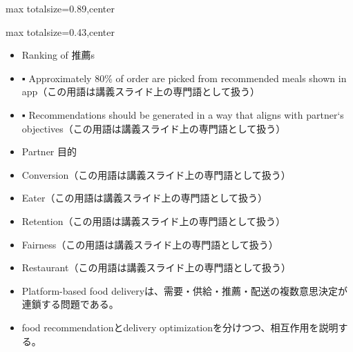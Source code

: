 \begin{minipage}[t]{0.58\textwidth}
\begin{adjustbox}{max totalsize={\textwidth}{0.89\textheight},center}
\begin{minipage}{\textwidth}
\end{minipage}
\end{adjustbox}
\end{minipage}


\clearpage
{}
\begin{minipage}[t]{0.405\textwidth}
\begin{adjustbox}{max totalsize={\textwidth}{0.43\textheight},center}
\begin{minipage}{\textwidth}\scriptsize
{}\begin{itemize}
\item Ranking of 推薦s
\item ▪ Approximately 80\% of order are picked from recommended meals shown in app（この用語は講義スライド上の専門語として扱う）
\item ▪ Recommendations should be generated in a way that aligns with partner‘s objectives（この用語は講義スライド上の専門語として扱う）
\item Partner 目的
\item Conversion（この用語は講義スライド上の専門語として扱う）
\item Eater（この用語は講義スライド上の専門語として扱う）
\item Retention（この用語は講義スライド上の専門語として扱う）
\item Fairness（この用語は講義スライド上の専門語として扱う）
\item Restaurant（この用語は講義スライド上の専門語として扱う）
\end{itemize}\begin{itemize}
\item Platform-based food deliveryは、需要・供給・推薦・配送の複数意思決定が連鎖する問題である。
\item food recommendationとdelivery optimizationを分けつつ、相互作用を説明する。
\end{itemize}
\end{minipage}
\end{adjustbox}
\end{minipage}\hfill
